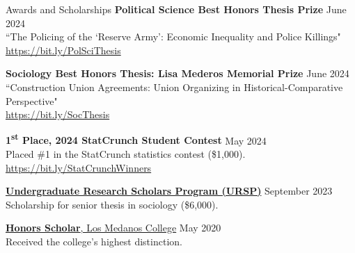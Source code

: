 \documentclass[
	11pt, %
]{resume} %
\begin{document}
\begin{samepage}
\begin{rSection}{Awards and Scholarships}
\textbf{Political Science Best Honors Thesis Prize} \hfill June 2024 \\
``The Policing of the `Reserve Army': Economic Inequality and Police Killings"\\
\href{https://bit.ly/PolSciThesis}{https://bit.ly/PolSciThesis}

\textbf{Sociology Best Honors Thesis: Lisa Mederos Memorial Prize} \hfill June 2024\\
``Construction Union Agreements: Union Organizing in Historical-Comparative Perspective"\\
\href{https://bit.ly/SocThesis}{https://bit.ly/SocThesis}

\textbf{1\textsuperscript{st} Place, 2024 StatCrunch Student Contest} \hfill May 2024\\
Placed \#1 in the StatCrunch statistics contest (\$\thinspace{}1,000).\\
\href{https://bit.ly/StatCrunchWinners}{https://bit.ly/StatCrunchWinners}

\href{https://hass.ugresearch.ucla.edu/scholarships/ursp/students/}{\textbf{Undergraduate Research Scholars Program (URSP)}} \hfill September 2023 \\
Scholarship for senior thesis in sociology (\$\thinspace{}6,000).

\href{https://www.losmedanos.edu/honors/prog.aspx\#:~:text=Honors\%20Scholar\%20Requirements}{\textbf{Honors Scholar}, Los Medanos College} \hfill May 2020 \\
Received the college’s highest distinction.
\end{rSection}
\end{samepage}
\end{document}
